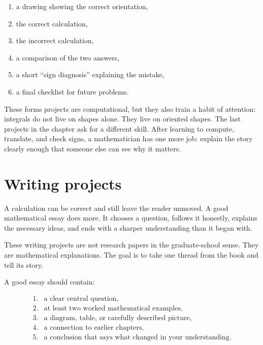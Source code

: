 \begin{enumerate}
\item a drawing showing the correct orientation,

\item the correct calculation,

\item the incorrect calculation,

\item a comparison of the two answers,

\item a short ``sign diagnosis'' explaining the mistake,

\item a final checklist for future problems.
\end{enumerate}

These forms projects are computational, but they also train a habit of attention:
integrals do not live on shapes alone.  They live on oriented shapes.  The last projects
in the chapter ask for a different skill.  After learning to compute, translate, and check
signs, a mathematician has one more job: explain the story clearly enough that someone
else can see why it matters.

\section{Writing projects}
\label{sec:20.6}

A calculation can be correct and still leave the reader unmoved.  A good mathematical
essay does more.  It chooses a question, follows it honestly, explains the necessary
ideas, and ends with a sharper understanding than it began with.

These writing projects are not research papers in the graduate-school sense.  They are
mathematical explanations.  The goal is to take one thread from the book and tell its
story.

A good essay should contain:

\[
\begin{array}{ll}
1. & \text{a clear central question,}\\
2. & \text{at least two worked mathematical examples,}\\
3. & \text{a diagram, table, or carefully described picture,}\\
4. & \text{a connection to earlier chapters,}\\
5. & \text{a conclusion that says what changed in your understanding.}
\end{array}
\]

